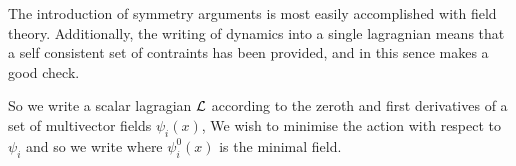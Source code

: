 
The introduction of symmetry arguments is most easily accomplished
with field theory.
Additionally, the writing of dynamics into a single lagragnian means
that a self consistent set of contraints has been provided,
and in this sence makes a good check.

So we write a scalar lagragian ${\cal L}$ according to the zeroth and first
derivatives of a set of  multivector fields $\psi_i(x)$,
We wish to minimise the action
with respect to $\psi_i$ and so we write 
where $\psi_i^0(x)$ is the minimal field.

